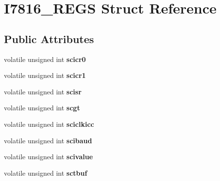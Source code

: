 \hypertarget{struct_i7816___r_e_g_s}{
\section{I7816\_\-REGS Struct Reference}
\label{struct_i7816___r_e_g_s}
}
\subsection*{Public Attributes}
\begin{DoxyCompactItemize}
\item 
\hypertarget{struct_i7816___r_e_g_s_a7537651ea10c20eb2cc30f3e78550815}{
volatile unsigned int {\bfseries scicr0}}
\label{struct_i7816___r_e_g_s_a7537651ea10c20eb2cc30f3e78550815}

\item 
\hypertarget{struct_i7816___r_e_g_s_afbcaf5e70553456e98e0caaaa9a10954}{
volatile unsigned int {\bfseries scicr1}}
\label{struct_i7816___r_e_g_s_afbcaf5e70553456e98e0caaaa9a10954}

\item 
\hypertarget{struct_i7816___r_e_g_s_a21aab38d41c31d655b84b008e76d96cd}{
volatile unsigned int {\bfseries scisr}}
\label{struct_i7816___r_e_g_s_a21aab38d41c31d655b84b008e76d96cd}

\item 
\hypertarget{struct_i7816___r_e_g_s_a7c4473ca01aecc30b7fce01f12507924}{
volatile unsigned int {\bfseries scgt}}
\label{struct_i7816___r_e_g_s_a7c4473ca01aecc30b7fce01f12507924}

\item 
\hypertarget{struct_i7816___r_e_g_s_a29d6b1724e522d5f6c87e14e89236dfa}{
volatile unsigned int {\bfseries sciclkicc}}
\label{struct_i7816___r_e_g_s_a29d6b1724e522d5f6c87e14e89236dfa}

\item 
\hypertarget{struct_i7816___r_e_g_s_a80b676d8c35c857ea4471b8c5a079f02}{
volatile unsigned int {\bfseries scibaud}}
\label{struct_i7816___r_e_g_s_a80b676d8c35c857ea4471b8c5a079f02}

\item 
\hypertarget{struct_i7816___r_e_g_s_afe5bd94d8ad60f149799beb4fa807bf9}{
volatile unsigned int {\bfseries scivalue}}
\label{struct_i7816___r_e_g_s_afe5bd94d8ad60f149799beb4fa807bf9}

\item 
\hypertarget{struct_i7816___r_e_g_s_aa31cd89584924aff53cf001772338a8b}{
volatile unsigned int {\bfseries sctbuf}}
\label{struct_i7816___r_e_g_s_aa31cd89584924aff53cf001772338a8b}


\end{DoxyCompactItemize}
